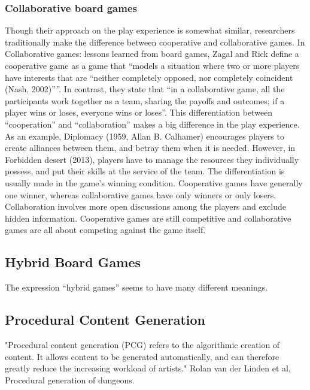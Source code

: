 \subsubsection{Collaborative board games}

Though their approach on the play experience is somewhat similar, researchers traditionally make the difference between cooperative and collaborative games. In Collaborative games: lessons learned from board games, Zagal and Rick define a cooperative game as a game that “models a situation where two or more players have interests that are “neither completely opposed, nor completely coincident (Nash, 2002)””. In contrast, they state that “in a collaborative game, all the participants work together as a team, sharing the payoffs and outcomes; if a player wins or loses, everyone wins or loses”. This differentiation between “cooperation” and “collaboration” makes a big difference in the play experience. As an example, Diplomacy (1959, Allan B. Calhamer) encourages players to create alliances between them, and betray them when it is needed. However, in Forbidden desert (2013), players have to manage the resources they individually possess, and put their skills at the service of the team. 
The differentiation is usually made in the game’s winning condition. Cooperative games have generally one winner, whereas collaborative games have only winners or only losers. Collaboration involves more open discussions among the players and exclude hidden information. Cooperative games are still competitive and collaborative games are all about competing against the game itself. 


\subsection{Hybrid Board Games}

The expression “hybrid games” seems to have many different meanings. 




\subsection{Procedural Content Generation}

"Procedural content generation (PCG) refers to the algorithmic creation of content. It allows content to be generated automatically, and can therefore greatly reduce the increasing workload of artists." Rolan van der Linden et al, Procedural generation of dungeons.
